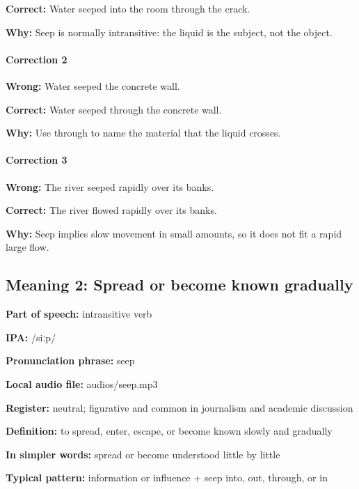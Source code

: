 \documentclass[11pt]{article}
\begin{document}
\textbf{Correct:} Water seeped into the room through the crack.

\textbf{Why:} Seep is normally intransitive: the liquid is the subject, not the object.

\paragraph{Correction 2}
\textbf{Wrong:} Water seeped the concrete wall.

\textbf{Correct:} Water seeped through the concrete wall.

\textbf{Why:} Use through to name the material that the liquid crosses.

\paragraph{Correction 3}
\textbf{Wrong:} The river seeped rapidly over its banks.

\textbf{Correct:} The river flowed rapidly over its banks.

\textbf{Why:} Seep implies slow movement in small amounts, so it does not fit a rapid large flow.

\subsection{Meaning 2: Spread or become known gradually}
\textbf{Part of speech:} intransitive verb

\textbf{IPA:} /siːp/

\textbf{Pronunciation phrase:} seep

\textbf{Local audio file:} audios/seep.mp3

\textbf{Register:} neutral; figurative and common in journalism and academic discussion

\textbf{Definition:} to spread, enter, escape, or become known slowly and gradually

\textbf{In simpler words:} spread or become understood little by little

\textbf{Typical pattern:} information or influence + seep into, out, through, or in
\end{document}
